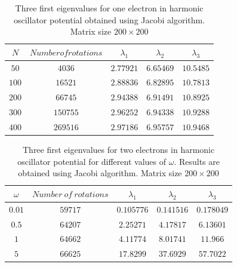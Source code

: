 \documentclass[10pt]{article}
\begin{document}
\begin{table}
  \caption{Three first eigenvalues for one electron in harmonic oscillator potential obtained using Jacobi algorithm. Matrix size $200 \times 200$}
  \label{tab:one}
  \begin{center}
    \begin{tabular}{c|c|c|c|c}
    \hline
		$N$ & $Number of rotations$ & $\lambda_1$ & $\lambda_2$ & $\lambda_3$ \\
        \hline
	$	50 $  & $ 4036  $ & $2.77921$ & $6.65469$ & $10.5485$ \\
	$	100$  & $ 16521 $ & $2.88836$ & $6.82895$ & $10.7813$ \\
	$	200$  & $ 66745 $ & $2.94388$ & $6.91491$ & $10.8925$ \\
	$	300$  & $ 150755$ & $2.96252$ & $6.94338$ & $10.9288$ \\
	$	400$  & $ 269516$ & $2.97186$ & $6.95757$ & $10.9468$ \\

	\end{tabular}
  \end{center}
\end{table}

\begin{table}
  \caption{Three first eigenvalues for two electrons in harmonic oscillator potential for different values of $\omega$. Results are obtained using Jacobi algorithm. Matrix size $200 \times 200$}
  \label{tab:two}
	\begin{center}
    \begin{tabular}{c|c|c|c|c}
    \hline
		$\omega$ & $Number\ of\ rotations$ & $\lambda_1$ & $\lambda_2$ & $\lambda_3$ \\
        \hline
		$0.01$ & $59717$ & $0.105776$ & $0.141516$  & $0.178049$ \\ 
		$0.5$  & $64207$ & $2.25271 $ & $4.17817 $  & $6.13601$ \\ 
		$1  $  & $64662$ & $4.11774 $ & $8.01741 $  & $11.966$ \\
		$5  $  & $66625$ & $17.8299 $ & $37.6929 $  & $57.7022$ \\

	\end{tabular}
  \end{center}
\end{table}
\end{document}
